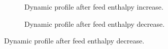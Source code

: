             \begin{figure}
                \scriptsize
                \center
                \begin{subfigure}{0.48\textwidth}
                    
                    \caption{Dynamic profile after feed enthalpy increase.}
                    \label{fig:N2_ADyn_plus}
                \end{subfigure}
                    \begin{subfigure}{0.48\textwidth}
                    
                    \caption{Dynamic profile after feed enthalpy decrease.}
                    \label{fig:N2_ADyn_minus}
                \end{subfigure}
            \end{figure}






